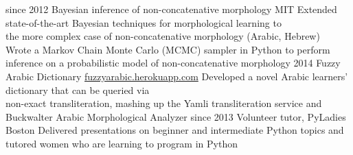 \documentclass[]{friggeri-cv}
\begin{document}
\begin{entrylist}
  \entry
    {since 2012}
    {Bayesian inference of non-concatenative morphology}
    {MIT}
    {\Squaredot Extended state-of-the-art Bayesian techniques for morphological learning to \\
    \hspace*{3pt} the more complex case of non-concatenative morphology (Arabic, Hebrew) \\
    \Squaredot Wrote a Markov Chain Monte Carlo (MCMC) sampler in Python to perform \\
    \hspace*{3pt} inference on a probabilistic model of non-concatenative morphology}
  \entry
    {2014}
    {Fuzzy Arabic Dictionary}
    {\href{http://fuzzyarabic.herokuapp.com}{fuzzyarabic.herokuapp.com}}
    {
    \Squaredot Developed a novel Arabic learners' dictionary that can be queried via \\
    \hspace*{3pt} non-exact transliteration, mashing up the Yamli transliteration service and \\
    \hspace*{3pt} Buckwalter Arabic Morphological Analyzer}
  \entry
    {since 2013}
    {Volunteer tutor, PyLadies Boston}
    {}
    {
    \Squaredot Delivered presentations on beginner and intermediate Python topics and \\
    \hspace*{3pt} tutored women who are learning to program in Python}
\end{entrylist}
\end{document}

